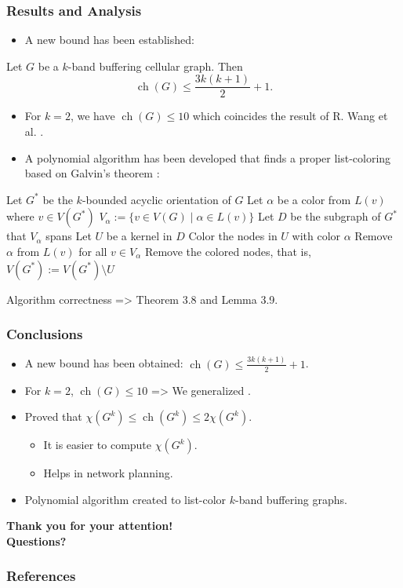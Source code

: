 \documentclass{beamer} %
\DeclareMathOperator{\ch}{ch}
\begin{document}
\begin{frame}[allowframebreaks]
\frametitle{Results and Analysis}
\justifying
\begin{itemize}
\item A new bound has been established:
\end{itemize}
\begin{theorem} Let $G$ be a $k$-band buffering cellular graph. Then 
$$\ch(G) \leqslant \frac{3k(k+1)}{2} + 1.$$
\end{theorem}
\begin{itemize}
\item For $k=2$, we have $\ch(G) \leqslant 10$ which coincides the result of R. Wang et al. \cite{7248845}.
\item A polynomial algorithm has been developed that finds a proper list-coloring based on Galvin's theorem \cite{Galvin:1995:LCI:199352.199369}:
\end{itemize}

\begin{algorithm}[H]\label{alg:szekeres-list-coloring}
  Let $G^*$ be the $k$-bounded acyclic orientation of $G$\;
   {
  	Let $\alpha$ be a color from $L(v)$ where $v \in V(G^*)$\;
  	$V_\alpha := \lbrace v \in V(G) \mid \alpha \in L(v) \rbrace$\;
  	Let $D$ be the subgraph of $G^*$ that $V_\alpha$ spans\;
  	Let $U$ be a kernel in $D$\;
  	Color the nodes in $U$ with color $\alpha$\;
  	Remove $\alpha$ from $L(v)$ for all $v \in V_\alpha$\;
  	Remove the colored nodes, that is, $V(G^*) := V(G^*) \setminus U$\;
  }
\end{algorithm}
Algorithm correctness => Theorem 3.8 and Lemma 3.9.
\end{frame}
\begin{frame}
\frametitle{Conclusions}
\justifying
\begin{itemize}
\item A new bound has been obtained: $\ch(G) \leqslant \frac{3k(k+1)}{2} + 1$.
\item For $k = 2$, $\ch(G) \leqslant 10$ => We generalized \cite{7248845}.
\item Proved that $\chi(G^k) \leqslant \ch(G^k) \leqslant 2 \chi(G^k)$.
\begin{itemize}
\item It is easier to compute $\chi(G^k)$.
\item Helps in network planning.
\end{itemize}
\item Polynomial algorithm created to list-color $k$-band buffering graphs.
\end{itemize}
\end{frame}

\begin{frame}
\justifying
\center
\textbf{Thank you for your attention!\\ Questions?}
\end{frame}

\begin{frame}[allowframebreaks]
        \frametitle{References}
        
        
\end{frame}
\end{document}
